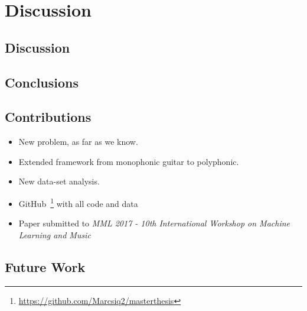 \chapter{Discussion}
\label{chap:discussion}

\section{Discussion}

\section{Conclusions}

\section{Contributions}
\begin{itemize}[noitemsep]
\item New problem, as far as we know.
\item Extended framework from monophonic guitar to polyphonic.
\item New data-set analysis.
\item GitHub~\footnote{\url{https://github.com/Marcsiq2/masterthesis}} with all code and data
\item Paper submitted to \textit{MML 2017 - 10th International Workshop on Machine Learning and Music}

\end{itemize}

\section{Future Work}

\cleardoublepage

